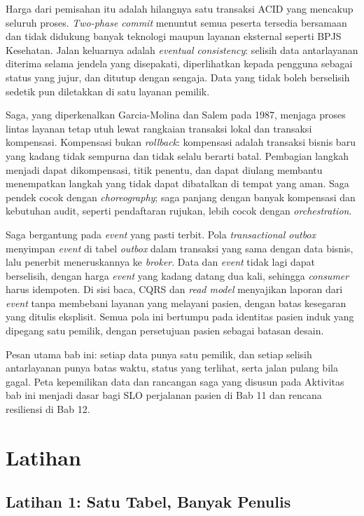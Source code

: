 Harga dari pemisahan itu adalah hilangnya satu transaksi ACID yang mencakup seluruh proses.
\textit{Two-phase commit} menuntut semua peserta tersedia bersamaan dan tidak didukung banyak
teknologi maupun layanan eksternal seperti BPJS Kesehatan. Jalan keluarnya adalah
\textit{eventual consistency}: selisih data antarlayanan diterima selama jendela yang disepakati,
diperlihatkan kepada pengguna sebagai status yang jujur, dan ditutup dengan sengaja. Data yang tidak
boleh berselisih sedetik pun diletakkan di satu layanan pemilik.

Saga, yang diperkenalkan Garcia-Molina dan Salem pada 1987, menjaga proses lintas layanan tetap
utuh lewat rangkaian transaksi lokal dan transaksi kompensasi. Kompensasi bukan
\textit{rollback}: kompensasi adalah transaksi bisnis baru yang kadang tidak sempurna dan tidak
selalu berarti batal. Pembagian langkah menjadi dapat dikompensasi, titik penentu, dan dapat diulang
membantu menempatkan langkah yang tidak dapat dibatalkan di tempat yang aman. Saga pendek cocok
dengan \textit{choreography}; saga panjang dengan banyak kompensasi dan kebutuhan audit, seperti
pendaftaran rujukan, lebih cocok dengan \textit{orchestration}.

Saga bergantung pada \textit{event} yang pasti terbit. Pola \textit{transactional outbox} menyimpan
\textit{event} di tabel \textit{outbox} dalam transaksi yang sama dengan data bisnis, lalu penerbit
meneruskannya ke \textit{broker}. Data dan \textit{event} tidak lagi dapat berselisih, dengan harga
\textit{event} yang kadang datang dua kali, sehingga \textit{consumer} harus idempoten. Di sisi baca,
CQRS dan \textit{read model} menyajikan laporan dari \textit{event} tanpa membebani layanan yang
melayani pasien, dengan batas kesegaran yang ditulis eksplisit. Semua pola ini bertumpu pada
identitas pasien induk yang dipegang satu pemilik, dengan persetujuan pasien sebagai batasan desain.

Pesan utama bab ini: setiap data punya satu pemilik, dan setiap selisih antarlayanan punya batas
waktu, status yang terlihat, serta jalan pulang bila gagal. Peta kepemilikan data dan rancangan
saga yang disusun pada Aktivitas bab ini menjadi dasar bagi SLO perjalanan pasien di Bab 11 dan
rencana resiliensi di Bab 12.

\section{Latihan}

\subsection*{Latihan 1: Satu Tabel, Banyak Penulis}

